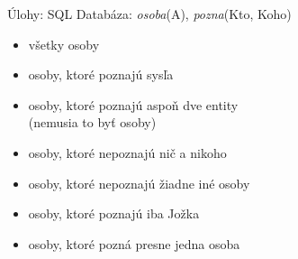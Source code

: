 \documentclass[12pt]{beamer}
\begin{document}
\begin{frame}{Úlohy: SQL}
Databáza: \emph{osoba}(A), \emph{pozna}(Kto, Koho)
\begin{itemize}
	\item všetky osoby
    \item osoby, ktoré poznajú sysľa
    \item osoby, ktoré poznajú aspoň dve entity\\ (nemusia to byť osoby)
    \item osoby, ktoré nepoznajú nič a nikoho
    \item osoby, ktoré nepoznajú žiadne iné osoby
    \item osoby, ktoré poznajú iba Jožka
    \item osoby, ktoré pozná presne jedna osoba
\end{itemize}
\end{frame}
\end{document}
